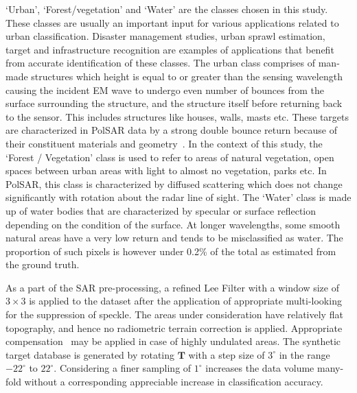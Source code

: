 `Urban', `Forest/vegetation' and `Water' are the classes chosen in this study. These   classes are usually an important input for various applications related to urban classification. Disaster management studies, urban sprawl estimation, target and infrastructure recognition are examples of applications that benefit from accurate identification of these classes. The urban class comprises of man-made structures which height is equal to or greater than  the sensing wavelength causing the incident EM wave to undergo even number of bounces from the surface surrounding the structure, and  the structure itself before returning back to the sensor. This includes structures like houses, walls, masts etc. These targets are characterized in PolSAR data by a strong double bounce return because of their constituent materials and geometry~\cite{elachi1990radar}.
In the context of this study, the `Forest / Vegetation' class is used to refer to areas of natural vegetation, open spaces between urban areas with light to almost no vegetation, parks etc. In PolSAR, this class is characterized  by diffused scattering which does not change significantly with rotation about the radar line of sight. The `Water' class is made up of water bodies that are characterized by specular or surface reflection depending on the condition of the surface. At longer wavelengths, some smooth natural areas have a very low return and tends to be misclassified as water. The proportion of such pixels is however under 0.2\% of the total as estimated from the ground truth. 



As a part of the SAR pre-processing, a refined Lee Filter with a window size of $3\times3$ is applied to the dataset after the application of appropriate multi-looking for the suppression of speckle. The areas under consideration have relatively flat topography, and hence no radiometric terrain correction is applied. Appropriate compensation~\cite{atwood2012improving} may be applied in case of highly undulated areas. 
The synthetic target database is generated by rotating $\mathbf{T}$ with a step size of $3^\circ$ in the range  $-22^\circ$  to $22^\circ$. Considering a finer sampling of $1^\circ$ increases the data volume many-fold without a corresponding appreciable increase in classification accuracy.

